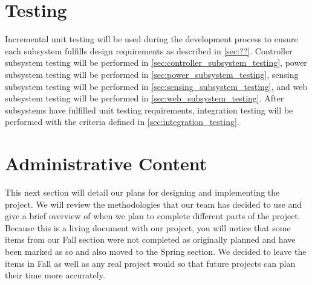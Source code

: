 \documentclass[12pt]{article}
\begin{document}
\section{Testing}                               %
Incremental unit testing will be used during the development process
to ensure each subsystem fulfills design requirements as described in
\autoref{sec:??}. Controller subsystem testing will be performed in
\autoref{sec:controller_subsystem_testing}, power subsystem testing will be
performed in \autoref{sec:power_subsystem_testing}, sensing subsystem testing
will be performed in \autoref{sec:sensing_subsystem_testing}, and web subsystem
testing will be performed in \autoref{sec:web_subsystem_testing}. After
subsystems have fulfilled unit testing requirements, integration testing will
be performed with the criteria defined in \autoref{sec:integration_testing}.

\section{Administrative Content}                %
This next section will detail our plans for designing and implementing the project. We will review the methodologies that our team has decided to use and give a brief overview of when we plan to complete different parts of the project. Because this is a living document with our project, you will notice that some items from our Fall section were not completed as originally planned and have been marked as so and also moved to the Spring section. We decided to leave the items in Fall as well as any real project would so that future projects can plan their time more accurately. 
\end{document}
